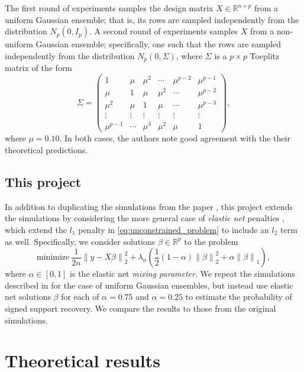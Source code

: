 \documentclass[letterpaper,12pt]{article}
\newcommand{\norm}[1]{\left\lVert#1\right\rVert}
\begin{document}
The first round of experiments samples the design matrix
$X \in \mathbb{R}^{n \times p}$ from a uniform Gaussian ensemble; that
is, its rows are sampled independently from the distribution
$N_p(0, I_p)$. A second round of experiments samples $X$ from a
non-uniform Gaussian ensemble; specifically, one such that the rows
are sampled independently from the distribution $N_p(0, \Sigma)$,
where $\Sigma$ is a $p \times p$ Toeplitz matrix of the form
\begin{equation*}
  \Sigma =
  \begin{pmatrix}
    1 & \mu & \mu^2 & \cdots & \mu^{p-2} & \mu^{p-1} \\
    \mu & 1 & \mu & \mu^2 & \cdots & \mu^{p-2} \\
    \mu^2 & \mu & 1 & \mu & \cdots & \mu^{p-3} \\
    \vdots & \vdots & \vdots & \vdots & \vdots & \vdots \\
    \mu^{p-1} & \cdots & \mu^3 & \mu^2 & \mu & 1
  \end{pmatrix},
\end{equation*}
where $\mu = 0.10$. In both cases, the authors note good agreement
with the their theoretical predictions.

\subsection*{This project}

In addition to duplicating the simulations from the paper
\cite{wainwright06}, this project extends the simulations by
considering the more general case of \textit{elastic net} penalties
\cite{zou_hastie05}, which extend the $l_1$ penalty in
\eqref{eq:unconstrained_problem} to include an $l_2$ term as
well. Specifically, we consider solutions $\beta \in \mathbb{R}^p$ to
the problem
\begin{equation*}
  \text{minimize} \
    \frac{1}{2n} \norm{y - X\beta}_2^2
      + \lambda_n \left( \frac{1}{2} (1 - \alpha) \norm{\beta}_2^2
      + \alpha \norm{\beta}_1 \right ),
\end{equation*}
where $\alpha \in [0, 1]$ is the elastic net \textit{mixing
  parameter}. We repeat the simulations described in
\cite{wainwright06} for the case of uniform Gaussian ensembles, but
instead use elastic net solutions $\beta$ for each of $\alpha = 0.75$
and $\alpha = 0.25$ to estimate the probability of signed support
recovery. We compare the results to those from the original
simulations.

\section*{Theoretical results}
\end{document}
